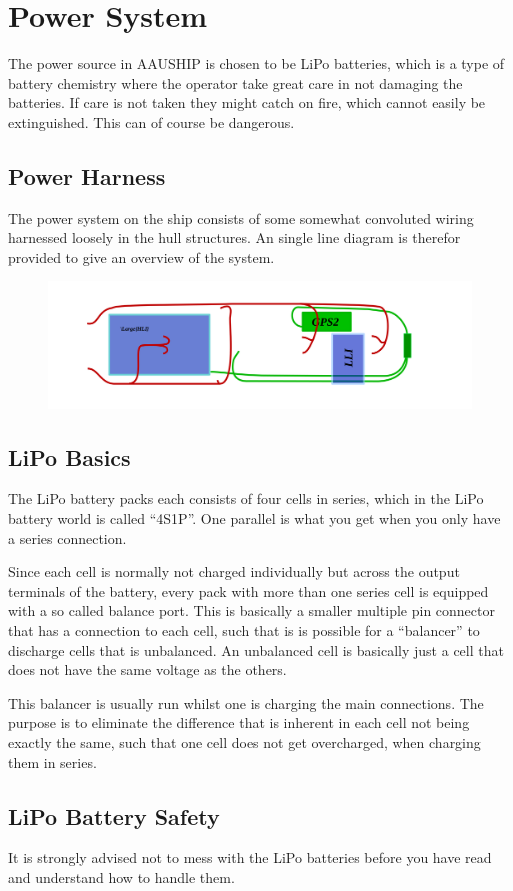 \section{Power System}

The power source in AAUSHIP is chosen to be LiPo batteries, which is
a type of battery chemistry where the operator take great care in not damaging
the batteries. If care is not taken they might catch on fire, which
cannot easily be extinguished. This can of course be dangerous.

\subsection{Power Harness}
The power system on the ship consists of some somewhat convoluted
wiring harnessed loosely in the hull structures. An single line
diagram is therefor provided to give an overview of the system.

\begin{figure}[htbp]
	\includegraphics[width=\textwidth]{fig/harness}
\end{figure}

\subsection{LiPo Basics}
The LiPo battery packs each consists of four cells in series, which in
the LiPo battery world is called ``4S1P''. One parallel is what you get
when you only have a series connection.

Since each cell is normally not charged individually but across the
output terminals of the battery, every pack with more than one series
cell is equipped with a so called balance port. This is basically a
smaller multiple pin connector that has a connection to each cell,
such that is is possible for a ``balancer'' to discharge cells that is
unbalanced. An unbalanced cell is basically just a cell that does not
have the same voltage as the others.

This balancer is usually run whilst one is charging the main
connections. The purpose is to eliminate the difference that is
inherent in each cell not being exactly the same, such that one cell
does not get overcharged, when charging them in series.

\subsection{LiPo Battery Safety}
\begin{tcolorbox}[colback=yellow!75!,colframe=red]
It is strongly advised not to mess with the LiPo batteries before you
have read and understand how to handle them.
\end{tcolorbox}

